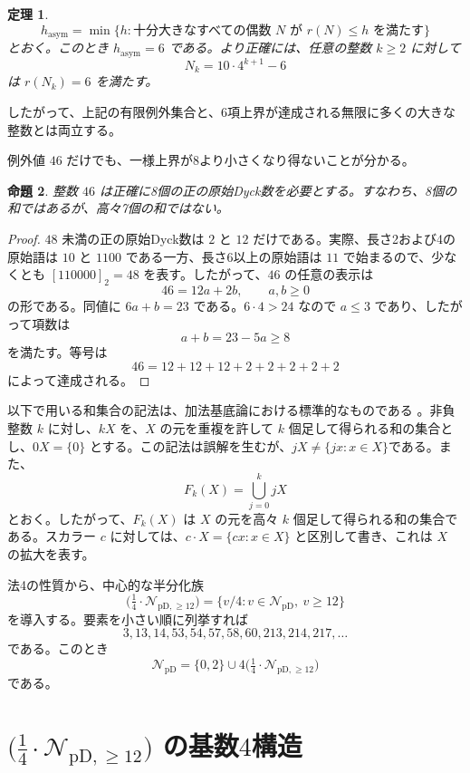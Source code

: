\documentclass[12pt]{ltjsarticle}
\theoremstyle{plain}
\newtheorem{theorem}{定理}
\newtheorem{proposition}[theorem]{命題}
\theoremstyle{definition}
\theoremstyle{plain}
\newcommand{\NpD}{\mathcal{N}_{\mathrm{pD}}}
\newcommand{\Pset}{%
  \bigl(\tfrac{1}{4}\cdot\mathcal{N}_{\mathrm{pD},\geq 12}\bigr)%
}
\begin{document}
\begin{theorem}\label{thm:asymptotic-order}
\[
 h_{\mathrm{asym}}
 =\min\{h:\text{十分大きなすべての偶数 }N\text{ が }r(N)\leq h\text{ を満たす}\}
\]
とおく。このとき $h_{\mathrm{asym}}=6$ である。より正確には、任意の整数 $k\geq2$ に対して
\[
 N_k=10\cdot4^{k+1}-6
\]
は $r(N_k)=6$ を満たす。
\end{theorem}

したがって、上記の有限例外集合と、6項上界が達成される無限に多くの大きな整数とは両立する。

例外値 $46$ だけでも、一様上界が8より小さくなり得ないことが分かる。

\begin{proposition}\label{prop:46}
整数 $46$ は正確に8個の正の原始Dyck数を必要とする。すなわち、8個の和ではあるが、高々7個の和ではない。
\end{proposition}

\begin{proof}
$48$ 未満の正の原始Dyck数は $2$ と $12$ だけである。実際、長さ2および4の原始語は $10$ と $1100$ である一方、長さ6以上の原始語は $11$ で始まるので、少なくとも $[110000]_2=48$ を表す。したがって、$46$ の任意の表示は
\[
        46=12a+2b,\qquad a,b\geq0
\]
の形である。同値に $6a+b=23$ である。$6\cdot4>24$ なので $a\leq3$ であり、したがって項数は
\[
        a+b=23-5a\geq8
\]
を満たす。等号は
\[
        46=12+12+12+2+2+2+2+2
\]
によって達成される。
\end{proof}


以下で用いる和集合の記法は、加法基底論における標準的なものである \cite[Chap.\ 1]{Nathanson}。非負整数 $k$ に対し、$kX$ を、$X$ の元を重複を許して $k$ 個足して得られる和の集合とし、$0X=\{0\}$ とする。この記法は誤解を生むが、$jX\neq\{jx : x\in X\}$である。また、
\[
 F_k(X)=\bigcup_{j=0}^{k}jX
\]
とおく。したがって、$F_k(X)$ は $X$ の元を高々 $k$ 個足して得られる和の集合である。スカラー $c$ に対しては、$c\cdot X=\{cx:x\in X\}$ と区別して書き、これは $X$ の拡大を表す。

法4の性質から、中心的な半分化族
\begin{equation}\label{eq:P-def}
 \Pset=\{v/4:v\in\NpD,\ v\geq12\}
\end{equation}
を導入する。要素を小さい順に列挙すれば
\[
 3,13,14,53,54,57,58,60,213,214,217,\ldots
\]
である。このとき
\begin{equation}\label{eq:NpD-decomp}
 \NpD=\{0,2\}\cup4\Pset
\end{equation}
である。

\section{\texorpdfstring{$\Pset$}{P} の基数\texorpdfstring{$4$}{4}構造}\label{sec:base4}
\end{document}
